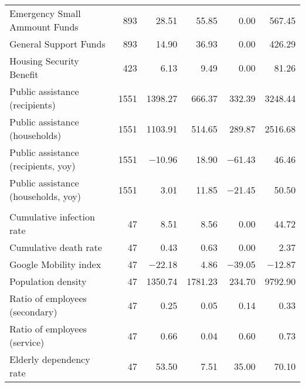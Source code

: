\begin{table}
\begin{threeparttable}
\begin{tabular}[t]{lrrrrr}
\hspace{1em}Emergency Small Ammount Funds & 893 & \num{28.51} & \num{55.85} & \num{0.00} & \num{567.45}\\
\hspace{1em}General Support Funds & 893 & \num{14.90} & \num{36.93} & \num{0.00} & \num{426.29}\\
\hspace{1em}Housing Security Benefit & 423 & \num{6.13} & \num{9.49} & \num{0.00} & \num{81.26}\\
\hspace{1em}Public assistance (recipients) & 1551 & \num{1398.27} & \num{666.37} & \num{332.39} & \num{3248.44}\\
\hspace{1em}Public assistance (households) & 1551 & \num{1103.91} & \num{514.65} & \num{289.87} & \num{2516.68}\\
\hspace{1em}Public assistance (recipients, yoy) & 1551 & \num{-10.96} & \num{18.90} & \num{-61.43} & \num{46.46}\\
\hspace{1em}Public assistance (households, yoy) & 1551 & \num{3.01} & \num{11.85} & \num{-21.45} & \num{50.50}\\
\addlinespace[0.3em]
\multicolumn{6}{l}{\textbf{Covariate}}\\
\hspace{1em}Cumulative infection rate & 47 & \num{8.51} & \num{8.56} & \num{0.00} & \num{44.72}\\
\hspace{1em}Cumulative death rate & 47 & \num{0.43} & \num{0.63} & \num{0.00} & \num{2.37}\\
\hspace{1em}Google Mobility index & 47 & \num{-22.18} & \num{4.86} & \num{-39.05} & \num{-12.87}\\
\hspace{1em}Population density & 47 & \num{1350.74} & \num{1781.23} & \num{234.70} & \num{9792.90}\\
\hspace{1em}Ratio of employees (secondary) & 47 & \num{0.25} & \num{0.05} & \num{0.14} & \num{0.33}\\
\hspace{1em}Ratio of employees (service) & 47 & \num{0.66} & \num{0.04} & \num{0.60} & \num{0.73}\\
\hspace{1em}Elderly dependency rate & 47 & \num{53.50} & \num{7.51} & \num{35.00} & \num{70.10}\\

\end{tabular}
\end{threeparttable}
\end{table}
